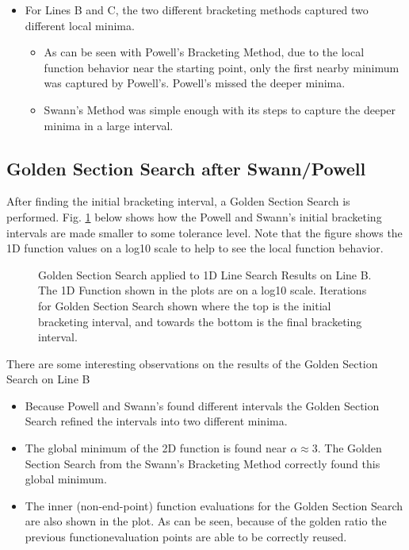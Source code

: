 \documentclass{article}
\begin{document}
\begin{itemize}
        \item For Lines B and C, the two different bracketing methods captured two different local minima.
        \begin{itemize}
            \item As can be seen with Powell's Bracketing Method, due to the local function behavior near the starting point, only the first nearby minimum was captured by Powell's. Powell's missed the deeper minima.
            \item Swann's Method was simple enough with its steps to capture the deeper minima in a large interval.
        \end{itemize}
    \end{itemize}


    \subsection{Golden Section Search after Swann/Powell}

    After finding the initial bracketing interval, a Golden Section Search is performed. Fig. \ref{fig:Q1_GoldenLineB} below shows how the Powell and Swann's initial bracketing intervals are made smaller to some tolerance level. Note that the figure shows the 1D function values on a log10 scale to help to see the local function behavior.

    \begin{figure}[H]
        \centering
        
        \caption{Golden Section Search applied to 1D Line Search Results on Line B. The 1D Function shown in the plots are on a log10 scale. Iterations for Golden Section Search shown where the top is the initial bracketing interval, and towards the bottom is the final bracketing interval.}
        \label{fig:Q1_GoldenLineB}
    \end{figure}

    There are some interesting observations on the results of the Golden Section Search on Line B
    \begin{itemize}
        \item Because Powell and Swann's found different intervals the Golden Section Search refined the intervals into two different minima. 
        \item The global minimum of the 2D function is found near $\alpha \approx 3$. The Golden Section Search from the Swann's Bracketing Method correctly found this global minimum.
        \item The  inner (non-end-point) function evaluations for the Golden Section Search are also shown in the plot. As can be seen, because of the golden ratio the previous functionevaluation points are able to be correctly reused.
    \end{itemize}
\end{document}
